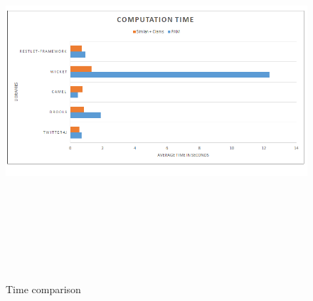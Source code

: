 \begin{figure}[!h]
\includegraphics[width=14cm,height=14cm,keepaspectratio]{images/time.png}
\centering
\caption{Time comparison}
\label{fig:cmd}
\end{figure}

